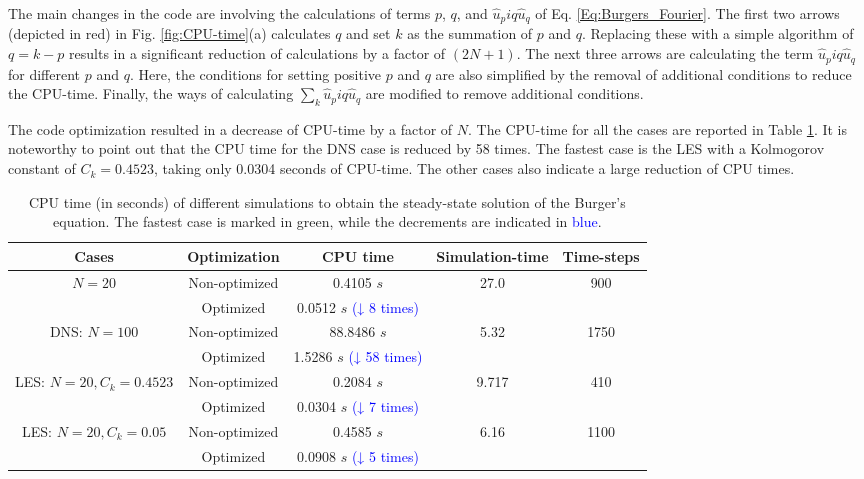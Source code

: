 \documentclass[a4paper]{article}
\begin{document}
The main changes in the code are involving the calculations of terms $ p $, $ q $, and $ \hat{u}_p iq \hat{u}_q $ of Eq. \ref{Eq:Burgers_Fourier}. The first two arrows (depicted in red) in Fig. \ref{fig:CPU-time}(a) calculates $ q $ and set $ k $ as the summation of $ p $ and $ q $. Replacing these with a simple algorithm of $ q=k-p $ results in a significant reduction of calculations by a factor of $ (2N+1) $. The next three arrows are calculating the term $ \hat{u}_p iq \hat{u}_q $ for different $ p $ and $ q $. Here, the conditions for setting positive $ p $ and $ q $ are also simplified by the removal of additional conditions to reduce the CPU-time. Finally, the ways of calculating $\sum_{k} \hat{u}_p iq \hat{u}_q $ are modified to remove additional conditions.

The code optimization resulted in a decrease of CPU-time by a factor of $ N $. The CPU-time for all the cases are reported in Table \ref{Table:CPU-time}. It is noteworthy to point out that the CPU time for the DNS case is reduced by 58 times. The fastest case is the LES with a Kolmogorov constant of $ C_k=0.4523 $, taking only 0.0304 seconds of CPU-time. The other cases also indicate a large reduction of CPU times.

\begin{table}[H]
	\centering
	\caption{CPU time (in seconds) of different simulations to obtain the steady-state solution of the Burger's equation. The fastest case is marked in \textcolor{mygreen}{green}, while the decrements are indicated in \textcolor{blue}{blue}.}
	\label{Table:CPU-time}
	\begin{tabular}{*5c}
		\toprule
		Cases & Optimization & CPU time & Simulation-time & Time-steps \\
		\midrule
		\multirow{2}{*}{$ N=20 $} & Non-optimized & 0.4105 $ s $ & \multirow{2}{*}{27.0} & \multirow{2}{*}{900} \\
		& Optimized & 0.0512 $ s $ \textcolor{blue}{(↓ 8 times)} &  &  \\
		\midrule
		\multirow{2}{*}{DNS: $ N=100 $} & Non-optimized & 88.8486 $ s $ & \multirow{2}{*}{5.32} & \multirow{2}{*}{1750} \\
		& Optimized & 1.5286 $ s $ \textcolor{blue}{(↓ 58 times)} &  &  \\
		\midrule
		\multirow{2}{*}{LES: $ N=20, C_k=0.4523 $} & Non-optimized & 0.2084 $ s $ & \multirow{2}{*}{9.717} & \multirow{2}{*}{410} \\
		& Optimized & \textcolor{mygreen}{0.0304 $ s $} \textcolor{blue}{(↓ 7 times)} &  &  \\
		\midrule
		\multirow{2}{*}{LES: $ N=20, C_k=0.05 $} & Non-optimized & 0.4585 $ s $ & \multirow{2}{*}{6.16} & \multirow{2}{*}{1100} \\
		& Optimized & 0.0908 $ s $ \textcolor{blue}{(↓ 5 times)} &  &  \\
		\bottomrule
	\end{tabular}
\end{table}
\end{document}
